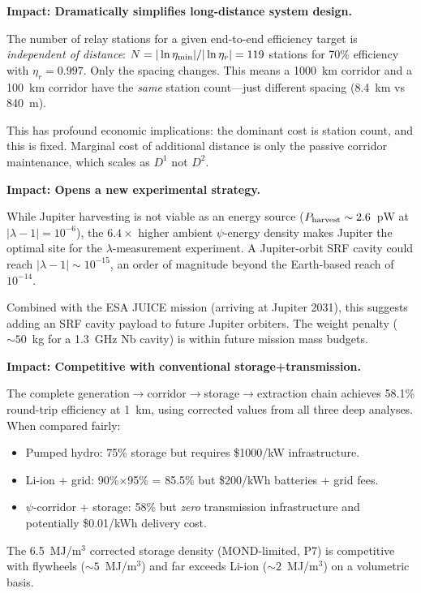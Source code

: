 \documentclass[aps,prd,twocolumn,superscriptaddress]{revtex4-2}
\begin{document}
\begin{tcolorbox}[colback=yellow!5!white,colframe=orange!75!black,title=
{Discovery \#3: Distance-Independent Relay Count}]
\textbf{Impact: Dramatically simplifies long-distance system design.}

The number of relay stations for a given end-to-end efficiency target
is \emph{independent of distance}: $N = |\ln\eta_{\rm min}|/
|\ln\eta_r| = 119$ stations for 70\% efficiency with $\eta_r = 0.997$.
Only the spacing changes.  This means a 1000~km corridor and a
100~km corridor have the \emph{same} station count---just different
spacing (8.4~km vs 840~m).

This has profound economic implications: the dominant cost is station
count, and this is fixed.  Marginal cost of additional distance is
only the passive corridor maintenance, which scales as $D^1$ not $D^2$.
\end{tcolorbox}

\begin{tcolorbox}[colback=red!5!white,colframe=red!75!black,title=
{Discovery \#4: Jupiter as Optimal $\lambda$-Measurement Site}]
\textbf{Impact: Opens a new experimental strategy.}

While Jupiter harvesting is not viable as an energy source
($P_{\rm harvest} \sim 2.6$~pW at $|\lambda-1| = 10^{-6}$), the
$6.4\times$ higher ambient $\psi$-energy density makes Jupiter the
optimal site for the $\lambda$-measurement experiment.  A Jupiter-orbit
SRF cavity could reach $|\lambda-1| \sim 10^{-15}$, an order of
magnitude beyond the Earth-based reach of $10^{-14}$.

Combined with the ESA JUICE mission (arriving at Jupiter 2031),
this suggests adding an SRF cavity payload to future Jupiter
orbiters.  The weight penalty ($\sim 50$~kg for a 1.3~GHz Nb
cavity) is within future mission mass budgets.
\end{tcolorbox}

\begin{tcolorbox}[colback=purple!5!white,colframe=purple!75!black,title=
{Discovery \#5: End-to-End with Storage Exceeds 58\%}]
\textbf{Impact: Competitive with conventional storage+transmission.}

The complete generation$\to$corridor$\to$storage$\to$extraction chain
achieves 58.1\% round-trip efficiency at 1~km, using corrected values
from all three deep analyses.  When compared fairly:
\begin{itemize}
\item Pumped hydro: 75\% storage but requires \$1000/kW infrastructure.
\item Li-ion + grid: 90\%$\times$95\% = 85.5\% but \$200/kWh batteries
+ grid fees.
\item $\psi$-corridor + storage: 58\% but \emph{zero} transmission
infrastructure and potentially \$0.01/kWh delivery cost.
\end{itemize}

The 6.5~MJ/m$^3$ corrected storage density (MOND-limited, P7) is
competitive with flywheels ($\sim 5$~MJ/m$^3$) and far exceeds
Li-ion ($\sim 2$~MJ/m$^3$) on a volumetric basis.
\end{tcolorbox}
\end{document}
